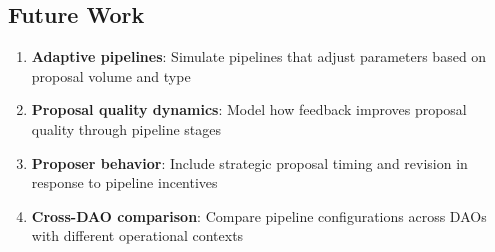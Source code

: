 \subsection{Future Work}

\begin{enumerate}
    \item \textbf{Adaptive pipelines}: Simulate pipelines that adjust parameters based on proposal volume and type
    \item \textbf{Proposal quality dynamics}: Model how feedback improves proposal quality through pipeline stages
    \item \textbf{Proposer behavior}: Include strategic proposal timing and revision in response to pipeline incentives
    \item \textbf{Cross-DAO comparison}: Compare pipeline configurations across DAOs with different operational contexts
\end{enumerate}
